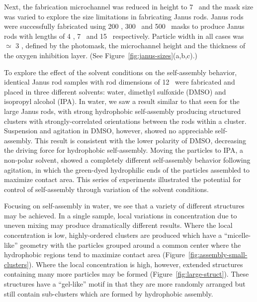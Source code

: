 Next, the fabrication microchannel was reduced in height to 7 \microns~and the mask size was varied to explore the
size limitations in fabricating Janus rods.  Janus rods were successfully fabricated 
using 200 \microns, 300 \microns~and 500 \microns~masks to produce Janus rods with lengths of 
4 \microns, 7 \microns~and 15 \microns~respectively. Particle width in all cases
was $\simeq$ 3 \microns, defined by the photomask, the 
microchannel height and the thickness of the oxygen inhibition layer. (See Figure~\ref{fig:janus-sizes}(a,b,c).)


To explore the effect of the solvent conditions on the self-assembly
behavior, identical Janus rod samples with rod dimensions of  
12   \microns~were fabricated and placed in three different solvents: water, dimethyl sulfoxide 
(DMSO) and isopropyl alcohol (IPA).  In water, we saw a result similar to that seen for the large Janus rods,
with strong hydrophobic self-assembly producing structured clusters with strongly-correlated orientations
between the rods within a cluster.  Suspension and agitation in DMSO, however, showed no appreciable self-assembly.
This result is consistent with the lower polarity of DMSO, decreasing the driving force
for hydrophobic self-assembly.  Moving the particles to IPA, a non-polar solvent, showed a completely different
self-assembly behavior following agitation, in which the green-dyed hydrophilic ends of the particles 
assembled to maximize contact area.  This series of experiments illustrated the potential for 
control of self-assembly through variation of the solvent conditions.



Focusing on self-assembly in water, we see that a variety of different structures may be 
achieved.  In a single sample, local variations in concentration due to uneven mixing may produce
dramatically different results.  Where the local concentration is low, highly-ordered clusters 
are produced which have a ``micelle-like'' geometry with the particles grouped around a common 
center where the hydrophobic regions tend to maximize contact area 
(Figure~\ref{fig:assembly-small-clusters}).  Where the local concentration
is high, however, extended structures containing many more particles may be formed
(Figure~\ref{fig:large-struct}).  These
structures have a ``gel-like'' motif in that they are more randomly arranged but still contain
sub-clusters which are formed by hydrophobic assembly.

